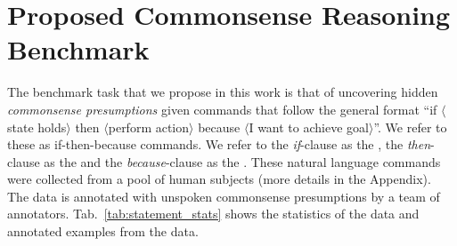 \section{Proposed Commonsense Reasoning Benchmark}
\label{sec:benchmark}
% 
The benchmark task that we propose in this work is that of uncovering hidden \emph{commonsense presumptions} given commands that follow the general format ``if $\langle$state holds$\rangle$ then $\langle$perform action$\rangle$ because $\langle$I want to achieve goal$\rangle$''. 
We refer to these as if-then-because commands. 
We refer to the \emph{if}-clause %
as the \textState, the \emph{then}-clause as the \textAction and the \emph{because}-clause as the \textGoal. 
These natural language commands were collected from a pool of human subjects (more details in the Appendix). 
The data is annotated with unspoken commonsense presumptions by a team of annotators. Tab.~\ref{tab:statement_stats} shows the statistics of the data and annotated examples from the data.
 

